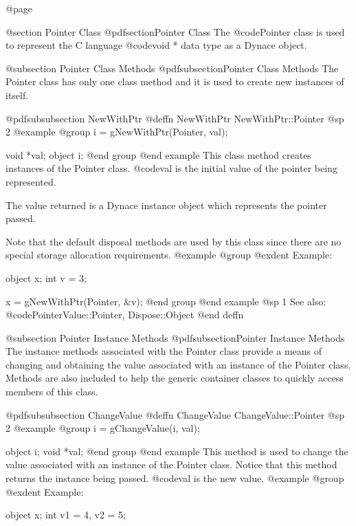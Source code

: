 @page

@section Pointer Class
@pdfsection{Pointer Class}
The @code{Pointer} class is used to represent the C language
@code{void *} data type as a Dynace object.





@subsection Pointer Class Methods
@pdfsubsection{Pointer Class Methods}
The Pointer class has only one class method and it is used to create
new instances of itself.



@pdfsubsubsection {NewWithPtr}
@deffn {NewWithPtr} NewWithPtr::Pointer
@sp 2
@example
@group
i = gNewWithPtr(Pointer, val);

void    *val;
object  i;
@end group
@end example
This class method creates instances of the Pointer class.  @code{val}
is the initial value of the pointer being represented.  

The value returned is a Dynace instance object which represents the pointer
passed.

Note that the default disposal methods are used by this class since
there are no special storage allocation requirements.
@example
@group
@exdent Example:

object  x;
int     v = 3;

x = gNewWithPtr(Pointer, &v);
@end group
@end example
@sp 1
See also:  @code{PointerValue::Pointer, Dispose::Object}
@end deffn





@subsection Pointer Instance Methods
@pdfsubsection{Pointer Instance Methods}
The instance methods associated with the Pointer class provide a
means of changing and obtaining the value associated with an instance of
the Pointer class.  Methods are also included to help the generic
container classes to quickly access members of this class.






@pdfsubsubsection {ChangeValue}
@deffn {ChangeValue} ChangeValue::Pointer
@sp 2
@example
@group
i = gChangeValue(i, val);

object  i;
void    *val;
@end group
@end example
This method is used to change the value associated with an instance of
the Pointer class.  Notice that this method returns the instance
being passed.  @code{val} is the new value.
@example
@group
@exdent Example:

object  x;
int     v1 = 4, v2 = 5;

